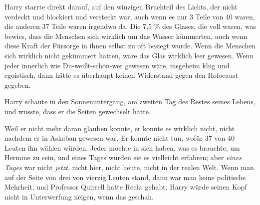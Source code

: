 Harry starrte direkt darauf, auf den winzigen Bruchteil des Lichts, der nicht verdeckt und blockiert und versteckt war, auch wenn es nur 3 Teile von 40 waren, die anderen 37 Teile waren irgendwo da. Die 7,5 \% des Glases, die voll waren, was bewies, dass die Menschen sich wirklich um das Wasser kümmerten, auch wenn diese Kraft der Fürsorge in ihnen selbst zu oft besiegt wurde. Wenn die Menschen sich wirklich nicht gekümmert hätten, wäre das Glas wirklich leer gewesen. Wenn jeder innerlich wie Du-weißt-schon-wer gewesen wäre, insgeheim klug und egoistisch, dann hätte es überhaupt keinen Widerstand gegen den Holocaust gegeben.

Harry schaute in den Sonnenuntergang, am zweiten Tag des Restes seines Lebens, und wusste, dass er die Seiten gewechselt hatte.

Weil er nicht mehr daran glauben konnte, er konnte es wirklich nicht, nicht nachdem er in Askaban gewesen war. Er konnte nicht tun, wofür 37 von 40 Leuten ihn wählen würden. Jeder mochte in sich haben, was es brauchte, um Hermine zu sein, und eines Tages würden sie es vielleicht erfahren; aber \emph{eines Tages} war nicht \emph{jetzt}, nicht hier, nicht heute, nicht in der realen Welt. Wenn man auf der Seite von drei von vierzig Leuten stand, dann war man keine politische Mehrheit, und Professor Quirrell hatte Recht gehabt, Harry würde seinen Kopf nicht in Unterwerfung neigen, wenn das geschah.


